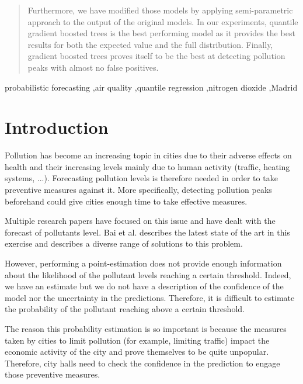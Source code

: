 \documentclass[a4paper,twocolumn,5p]{elsarticle}
\begin{document}
\begin{frontmatter}
\begin{abstract}
Furthermore, we have modified those models by applying 
semi-parametric approach to the output of the original models. 
In our experiments, quantile gradient boosted 
trees is the best performing model as it provides the best 
results for both the expected value and the full 
distribution. Finally, gradient boosted 
trees proves itself to be the best at detecting pollution peaks
with almost no false positives.
\end{abstract}

\begin{keyword}
probabilistic forecasting \sep air quality \sep quantile regression
\sep nitrogen dioxide \sep Madrid
\end{keyword}

\end{frontmatter}


\section{Introduction }
\label{sec:intro}


Pollution has become an increasing topic in cities due to their
adverse effects on health and their increasing levels mainly due to
human activity (traffic, heating systems, ...). Forecasting pollution
levels is therefore needed in order to take preventive measures
against it. More specifically, detecting pollution peaks beforehand
could give cities enough time to take effective measures.

Multiple research papers have focused on this issue and have dealt
with the forecast of pollutants level. Bai et al. \cite{bai_air_2018}
describes the latest state of the art in this exercise and describes 
a diverse range of solutions to this problem.

However, performing a point-estimation does not provide enough 
information about the likelihood of the pollutant levels 
reaching a certain 
threshold. Indeed, we have an estimate but we do not have a
description of the confidence of the model nor the uncertainty 
in the predictions. Therefore, it is difficult to estimate the 
probability of the pollutant reaching above a certain threshold.

The reason this probability estimation is so important is because 
the measures taken by cities to limit pollution (for example,
limiting traffic) impact the 
economic activity of the city and prove themselves to be quite
 unpopular. 
Therefore, city halls need to check the confidence in the 
prediction to engage those preventive measures.
\end{document}
